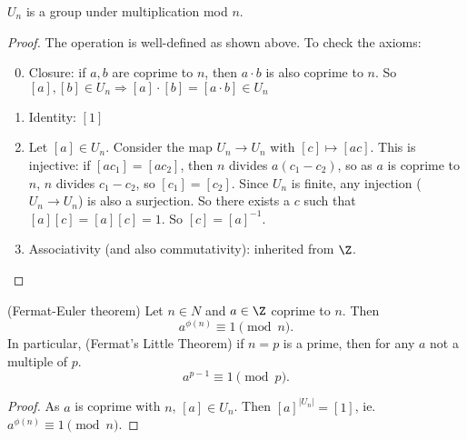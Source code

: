 \documentclass[a4paper]{article}
\begin{document}
\begin{prop}
  $U_n$ is a group under multiplication mod $n$.
\end{prop}

\begin{proof}
  The operation is well-defined as shown above. To check the axioms:
  \begin{enumerate}[label=\arabic{*}.]
      \setcounter{enumi}{-1}
    \item Closure: if $a, b$ are coprime to $n$, then $a\cdot b$ is also coprime to $n$. So $[a], [b]\in U_n \Rightarrow [a]\cdot [b] = [a\cdot b]\in U_n$
    \item Identity: $[1]$
    \item Let $[a]\in U_n$. Consider the map $U_n \to U_n$ with $[c]\mapsto [ac]$. This is injective: if $[ac_1] = [ac_2]$, then $n $ divides $a(c_1 - c_2)$, so as $a$ is coprime to $n$, $n$ divides $c_1 - c_2$, so $[c_1] = [c_2]$. Since $U_n$ is finite, any injection ($U_n \to U_n$) is also a surjection. So there exists a $c$ such that $[a][c] = [a][c] = 1$. So $[c] = [a]^{-1}$.
    \item Associativity (and also commutativity): inherited from $\Z$.
  \end{enumerate}
\end{proof}
\begin{thm}
  (Fermat-Euler theorem) Let $n\in N$ and $a\in \Z$ coprime to $n$. Then
  \[
    a^{\phi(n)} \equiv 1\pmod n.
  \]
  In particular, (Fermat's Little Theorem) if $n = p$ is a prime, then for any $a$ not a multiple of $p$.
  \[
    a^{p - 1}\equiv 1\pmod p.
  \]
\end{thm}

\begin{proof}
  As $a$ is coprime with $n$, $[a]\in U_n$. Then $[a]^{|U_n|} = [1]$, ie. $a^{\phi(n)} \equiv 1\pmod n$.
\end{proof}
\end{document}
